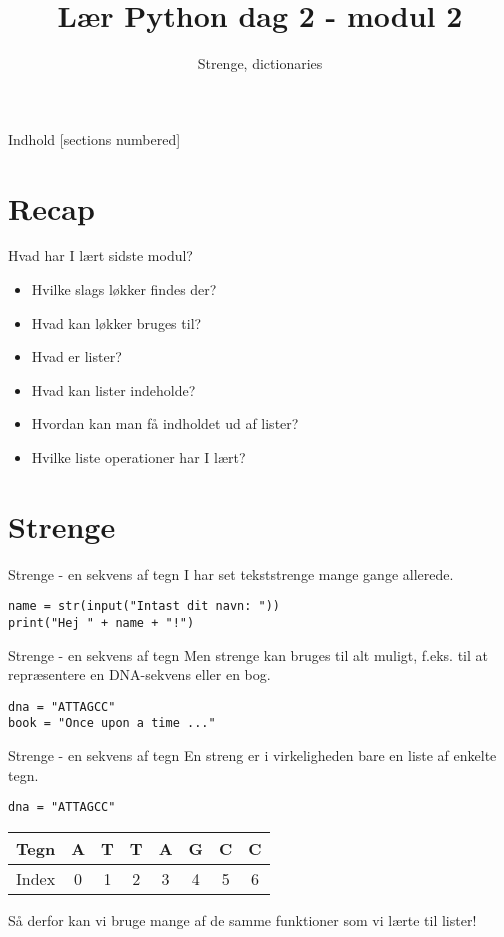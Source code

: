\documentclass[main.tex]{subfiles}
\title{Lær Python dag 2 - modul 2}
\subtitle{Strenge, dictionaries}
\begin{document}
\maketitle

\begin{frame}{Indhold}
  [sections numbered]
  \tableofcontents[hideallsubsections]
\end{frame}

\section{Recap}
\begin{frame}[fragile]{Hvad har I lært sidste modul?}
	\begin{itemize}
		\item Hvilke slags løkker findes der?
		\item Hvad kan løkker bruges til?
		\item Hvad er lister?
		\item Hvad kan lister indeholde?
		\item Hvordan kan man få indholdet ud af lister?
		\item Hvilke liste operationer har I lært?
	\end{itemize}
\end{frame}

\section{Strenge}
\begin{frame}[fragile]{Strenge - en sekvens af tegn}
	I har set tekststrenge mange gange allerede.
	\begin{lstlisting}[style=python]
name = str(input("Intast dit navn: "))
print("Hej " + name + "!")
	\end{lstlisting}
\end{frame}

\begin{frame}[fragile]{Strenge - en sekvens af tegn}
	Men strenge kan bruges til alt muligt, f.eks. til at repræsentere en DNA-sekvens eller en bog.
	\begin{lstlisting}[style=python]
dna = "ATTAGCC"
book = "Once upon a time ..."
	\end{lstlisting}
\end{frame}

\begin{frame}[fragile]{Strenge - en sekvens af tegn}
	En streng er i virkeligheden bare en liste af enkelte tegn.
	\begin{lstlisting}[style=python]
dna = "ATTAGCC"
	\end{lstlisting}
	\begin{tabular}{|l|c|c|c|c|c|c|c|}
		\hline
		Tegn 	& A & T & T & A & G & C & C \\
		\hline
		Index 	& 0 & 1 & 2 & 3 & 4 & 5 & 6 \\
		\hline
	\end{tabular}
\pause

Så derfor kan vi bruge mange af de samme funktioner som vi lærte til lister!
\end{frame}
\end{document}
